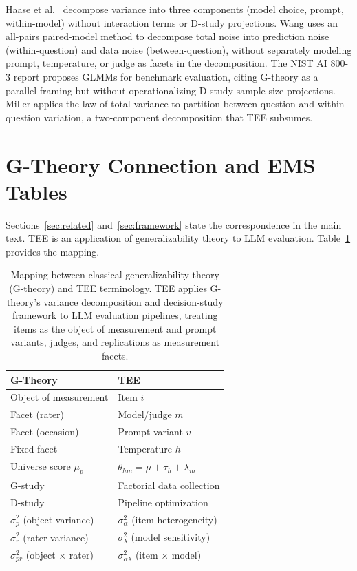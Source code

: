 Haase et al.\ \citep{haase2026withinmodel} decompose variance into three components (model choice, prompt, within-model) without interaction terms or D-study projections. Wang \citep{wang2024measuring} uses an all-pairs paired-model method to decompose total noise into prediction noise (within-question) and data noise (between-question), without separately modeling prompt, temperature, or judge as facets in the decomposition. The NIST AI 800-3 report \citep{keller2026nist} proposes GLMMs for benchmark evaluation, citing G-theory as a parallel framing but without operationalizing D-study sample-size projections. Miller \citep{miller2024errorbars} applies the law of total variance to partition between-question and within-question variation, a two-component decomposition that TEE subsumes.



\clearpage

\section{G-Theory Connection and EMS Tables}
\label{si:gtheory}

Sections~\ref{sec:related} and~\ref{sec:framework} state the correspondence in the main text. TEE is an application of generalizability theory \citep[G-theory;][]{cronbach1972dependability, brennan2001gtheory} to LLM evaluation. Table~\ref{tab:gtheory} provides the mapping.

\begin{table}[ht]
\centering
\caption{Mapping between classical generalizability theory (G-theory) and TEE terminology. TEE applies G-theory's variance decomposition and decision-study framework to LLM evaluation pipelines, treating items as the object of measurement and prompt variants, judges, and replications as measurement facets.}
\label{tab:gtheory}
\small
\begin{tabular}{ll}
\toprule
\textbf{G-Theory} & \textbf{TEE} \\
\midrule
Object of measurement & Item $i$ \\
Facet (rater) & Model/judge $m$ \\
Facet (occasion) & Prompt variant $v$ \\
Fixed facet & Temperature $h$ \\
Universe score $\mu_p$ & $\theta_{hm} = \mu + \tau_h + \lambda_m$ \\
G-study & Factorial data collection \\
D-study & Pipeline optimization \\
$\sigma^2_p$ (object variance) & $\sigma^2_\alpha$ (item heterogeneity) \\
$\sigma^2_r$ (rater variance) & $\sigma^2_\lambda$ (model sensitivity) \\
$\sigma^2_{pr}$ (object $\times$ rater) & $\sigma^2_{\alpha\lambda}$ (item $\times$ model) \\
\bottomrule
\end{tabular}
\end{table}


